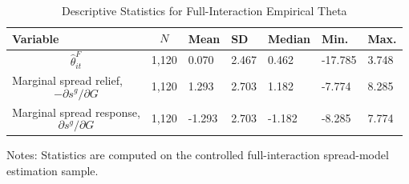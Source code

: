 \begin{table}[H]\centering
\begin{threeparttable}
\caption{Descriptive Statistics for Full-Interaction Empirical Theta}
\label{tab:theta_descriptive_stats}
\scriptsize
\begin{tabularx}{\textwidth}{lYYYYYY}
\toprule
Variable & $$N$$ & Mean & SD & Median & Min. & Max. \\
\midrule
$$\widehat{\theta}^{F}_{it}$$ & 1,120 & 0.070 & 2.467 & 0.462 & -17.785 & 3.748 \\
Marginal spread relief, $$-\partial s^g/\partial G$$ & 1,120 & 1.293 & 2.703 & 1.182 & -7.774 & 8.285 \\
Marginal spread response, $$\partial s^g/\partial G$$ & 1,120 & -1.293 & 2.703 & -1.182 & -8.285 & 7.774 \\
\bottomrule
\end{tabularx}
\begin{tablenotes}[flushleft]\footnotesize
\item Notes: Statistics are computed on the controlled full-interaction spread-model estimation sample.
\end{tablenotes}
\end{threeparttable}
\end{table}
